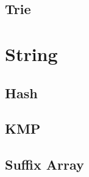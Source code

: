 \documentclass[a4paper,landscape]{article}
\begin{document}
\begin{multicols}{2}
\subsection{Trie}
	


\section{String}
\subsection{Hash}
	
\subsection{KMP}
	
\subsection{Suffix Array}
	

\end{multicols}
\end{document}
